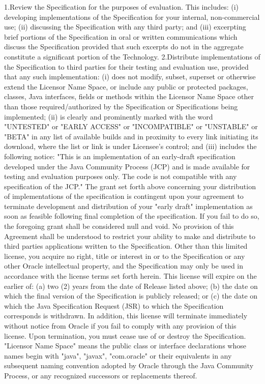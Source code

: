 \begin{flushleft}
1.Review the Specification for the purposes of evaluation. This includes: (i) developing implementations of the Specification for your internal, non-commercial use; (ii) discussing the Specification with any third party; and (iii) excerpting brief portions of the Specification in oral or written communications which discuss the Specification provided that such excerpts do not in the aggregate constitute a significant portion of the Technology.
2.Distribute implementations of the Specification to third parties for their testing and evaluation use, provided that any such implementation:
(i) does not modify, subset, superset or otherwise extend the Licensor Name Space, or include any public or protected packages, classes, Java interfaces, fields or methods within the Licensor Name Space other than those required/authorized by the Specification or Specifications being implemented;
(ii) is clearly and prominently marked with the word "UNTESTED" or "EARLY ACCESS" or "INCOMPATIBLE" or "UNSTABLE" or "BETA" in any list of available builds and in proximity to every link initiating its download, where the list or link is under Licensee's control; and
(iii) includes the following notice:
"This is an implementation of an early-draft specification developed under the Java Community Process (JCP) and is made available for testing and evaluation purposes only. The code is not compatible with any specification of the JCP."
The grant set forth above concerning your distribution of implementations of the specification is contingent upon your agreement to terminate development and distribution of your "early draft" implementation as soon as feasible following final completion of the specification. If you fail to do so, the foregoing grant shall be considered null and void. 
No provision of this Agreement shall be understood to restrict your ability to make and distribute to third parties applications written to the Specification.
Other than this limited license, you acquire no right, title or interest in or to the Specification or any other Oracle intellectual property, and the Specification may only be used in accordance with the license terms set forth herein. This license will expire on the earlier of: (a) two (2) years from the date of Release listed above; (b) the date on which the final version of the Specification is publicly released; or (c) the date on which the Java Specification Request (JSR) to which the Specification corresponds is withdrawn. In addition, this license will terminate immediately without notice from Oracle if you fail to comply with any provision of this license. Upon termination, you must cease use of or destroy the Specification.
"Licensor Name Space" means the public class or interface declarations whose names begin with "java", "javax", "com.oracle" or their equivalents in any subsequent naming convention adopted by Oracle through the Java Community Process, or any recognized successors or replacements thereof.


\end{flushleft}
